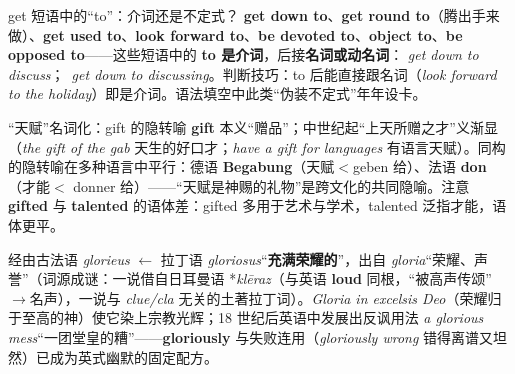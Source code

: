 \documentclass[../main.tex]{subfiles}
\begin{document}


\begin{gram}{get 短语中的“to”：介词还是不定式？}
\textbf{get down to}、\textbf{get round to}（腾出手来做）、\textbf{get used to}、\textbf{look forward to}、\textbf{be devoted to}、\textbf{object to}、\textbf{be opposed to}——这些短语中的 \textbf{to 是介词}，后接\textbf{名词或动名词}： \textit{get down to discuss}；\checkmark\ \textit{get down to discussing}。判断技巧：to 后能直接跟名词（\textit{look forward to the holiday}）即是介词。语法填空中此类“伪装不定式”年年设卡。
\end{gram}



\begin{gram}{“天赋”名词化：gift 的隐转喻}
\textbf{gift} 本义“赠品”；中世纪起“上天所赠之才”义渐显（\textit{the gift of the gab} 天生的好口才；\textit{have a gift for languages} 有语言天赋）。同构的隐转喻在多种语言中平行：德语 \textbf{Begabung}（天赋$<$geben 给）、法语 \textbf{don}（才能$<$ donner 给）——“天赋是神赐的礼物”是跨文化的共同隐喻。注意 \textbf{gifted} 与 \textbf{talented} 的语体差：gifted 多用于艺术与学术，talented 泛指才能，语体更平。
\end{gram}




\begin{origin}
经由古法语 \textit{glorieus} $\leftarrow$ 拉丁语 \textit{gloriosus}“\textbf{充满荣耀的}”，出自 \textit{gloria}“荣耀、声誉”（词源成谜：一说借自日耳曼语 *\textit{klēraz}（与英语 \textbf{loud} 同根，“被高声传颂”$\to$名声），一说与 \textit{clue/cla} 无关的土著拉丁词）。\textit{Gloria in excelsis Deo}（荣耀归于至高的神）使它染上宗教光辉；18 世纪后英语中发展出反讽用法 \textit{a glorious mess}“一团堂皇的糟”——\textbf{gloriously} 与失败连用（\textit{gloriously wrong} 错得离谱又坦然）已成为英式幽默的固定配方。
\end{origin}
\end{document}
